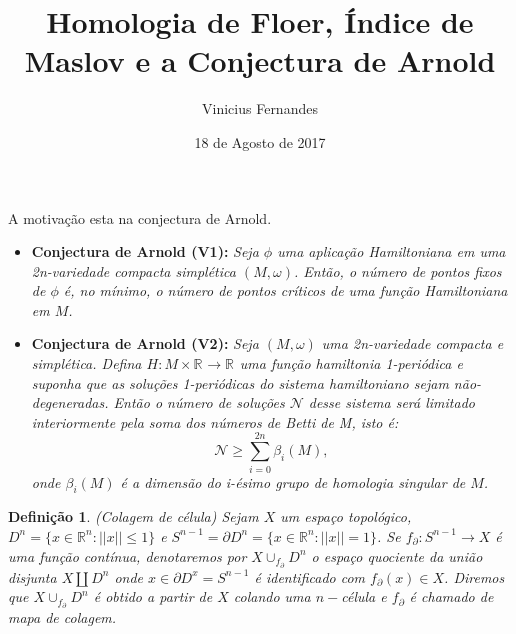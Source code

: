 \documentclass{beamer}
\author{Vinicius Fernandes}
\title{Homologia de Floer, Índice de Maslov e a Conjectura de Arnold}
\institute{Universidade Federal do ABC}
\date{18 de Agosto de 2017}
\newtheorem{definicao}[teorema]{Definição}
\newcommand{\real}[1]{\mathbb{R}^{#1}}
\newcommand{\reta}{\real{}}
\begin{document}
	
\begin{frame}[t,plain]
\titlepage
\end{frame}

\begin{frame}
	
	A motivação esta na conjectura de Arnold.
	
	\begin{itemize}
		\item \textbf{Conjectura de Arnold (V1):} \textit{Seja $\phi$ uma aplicação Hamiltoniana em uma 2n-variedade compacta simplética $(M, \omega)$. Então, o número de pontos fixos de $\phi$ é, no mínimo, o número de pontos críticos de uma função Hamiltoniana em $M$.}
		\item \textbf{Conjectura de Arnold (V2):} \textit	{Seja $(M,\omega)$ uma 2n-variedade compacta e simplética. Defina  $H:M\times \real{} \to \reta$  uma função hamiltonia 1-periódica e suponha que as soluções 1-periódicas do sistema hamiltoniano sejam não-degeneradas. Então o número de soluções $\mathcal{N}$ desse sistema será limitado interiormente pela soma dos números de Betti de M, isto é:
			$$
			\mathcal{N}\geq \sum_{i=0}^{2n}\beta_{i}(M),
			$$
			onde $\beta_{i}(M)$ é a dimensão do i-ésimo grupo de homologia singular de $M$.}
	\end{itemize}
\end{frame}

\begin{frame}
	\begin{definicao}
		(Colagem de célula) Sejam $X$ um espaço topológico, $D^{n}=\{x\in \mathbb{R}^{n} : ||x|| \leq 1\}$ e $S^{n-1} = \partial D^{n}=\{x\in \mathbb{R}^{n} : ||x|| = 1\}$. Se $f_{\partial}:S^{n-1} \to X$ é uma função contínua, denotaremos por $X\cup_{f_{\partial}}D^{n}$ o espaço quociente da união disjunta $X \coprod D^{n}$ onde $x \in \partial D^{x} = S^{n-1}$ é identificado com $f_{\partial}(x) \in X$. Diremos que $X\cup_{f_{\partial}}D^{n}$ é obtido a partir de $X$ colando uma $n-$célula e $f_{\partial}$ é chamado de mapa de colagem.
	\end{definicao}
\end{frame}
\end{document}

